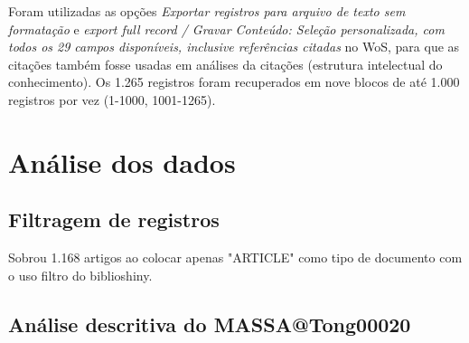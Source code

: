 Foram utilizadas as opções \textit{Exportar registros para arquivo de texto sem formatação} e \textit{export full record / Gravar Conteúdo: Seleção personalizada, com todos os 29 campos disponíveis, inclusive referências citadas} no WoS, para que as citações também fosse usadas em análises da citações (estrutura intelectual do conhecimento). Os 1.265 registros foram recuperados em nove blocos de até 1.000 registros por vez (1-1000, 1001-1265).

\section{Análise dos dados}



\subsection{Filtragem de registros}

Sobrou 1.168 artigos ao colocar apenas "ARTICLE" como tipo de documento com o uso filtro do biblioshiny.



\subsection{Análise descritiva do %
MASSA@Tong00020}

